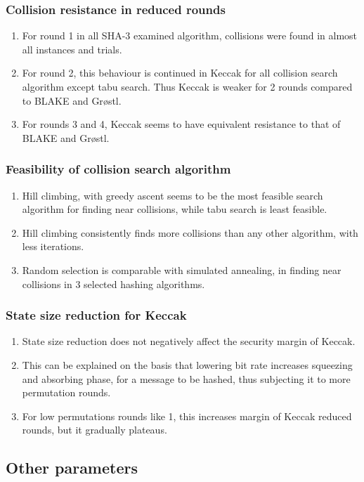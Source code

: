 \documentclass{beamer}
\begin{document}
\begin{frame}
\frametitle{Collision resistance in reduced rounds}
\begin{enumerate}
\item For round 1 in all SHA-3 examined algorithm, collisions were found in almost all instances and
trials.
\item For round 2, this behaviour is continued in Keccak for all collision search algorithm except tabu
search. Thus Keccak is weaker for 2 rounds compared to BLAKE and Gr{\o}stl.
\item For rounds 3 and 4, Keccak seems to have equivalent resistance to that of BLAKE and Gr{\o}stl.
\end{enumerate}
\end{frame}

\begin{frame}
\frametitle{Feasibility of collision search algorithm}
\begin{enumerate}
\item Hill climbing, with greedy ascent seems to be the most feasible search algorithm for finding near
collisions, while tabu search is least feasible.
\item Hill climbing consistently finds more collisions than any other algorithm, with less iterations.
\item Random selection is comparable with simulated annealing, in finding near collisions in 3 selected
hashing algorithms.
\end{enumerate}
\end{frame}

\begin{frame}
\frametitle{State size reduction for Keccak}
\begin{enumerate}
\item State size reduction does not negatively affect the security margin of Keccak.
\item This can be explained on the basis that lowering bit rate increases squeezing and absorbing phase, for 
a message to be hashed, thus subjecting it to more permutation rounds.
\item For low permutations rounds like 1, this increases margin of Keccak reduced rounds, but it gradually 
plateaus.
\end{enumerate}
\end{frame}

\subsection{Other parameters}
\end{document}
